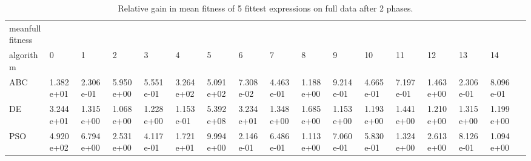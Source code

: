 \begin{landscape}
\begin{table}[]
\begin{adjustbox}{width=1.7\textwidth}
\begin{tabular}{lllllllllllllllll}
\end{tabular}
\end{adjustbox}
\end{table}


\begin{table}[]
\centering
\caption{Relative gain in mean fitness of 5 fittest expressions on full data after 2 phases.}
\label{table:2phasemeanfull}
\begin{adjustbox}{width=1.7\textwidth}
\begin{tabular}{lllllllllllllllll}
 meanfullfitness     &           &           &           &           &           &           &           &           &           &           &           &           &           &           &           &  \\
algorithm           & 0         & 1         & 2         & 3         & 4         & 5         & 6         & 7         & 8         & 9         & 10        & 11        & 12        & 13        & 14        &  \\
ABC                 & 1.382e+01 & 2.306e-01 & 5.950e+00 & 5.551e-01 & 3.264e+02 & 5.091e+02 & 7.308e-02 & 4.463e-01 & 1.188e+00 & 9.214e-01 & 4.665e-01 & 7.197e-01 & 1.463e+00 & 2.306e-01 & 8.096e-01 &  \\
DE                  & 3.244e+01 & 1.315e+00 & 1.068e+00 & 1.228e+00 & 1.153e-01 & 5.392e+08 & 3.234e+01 & 1.348e+00 & 1.685e+00 & 1.153e+00 & 1.193e+00 & 1.441e+00 & 1.210e+00 & 1.315e+00 & 1.199e+00 &  \\
PSO                 & 4.920e+02 & 6.794e+00 & 2.531e+00 & 4.117e-01 & 1.721e+01 & 9.994e+00 & 2.146e-01 & 6.486e-01 & 1.113e+00 & 7.060e-01 & 5.830e-01 & 1.324e+00 & 2.613e+00 & 8.126e-01 & 1.094e+00 & \\

\end{tabular}
\end{adjustbox}
\end{table}
\end{landscape}



